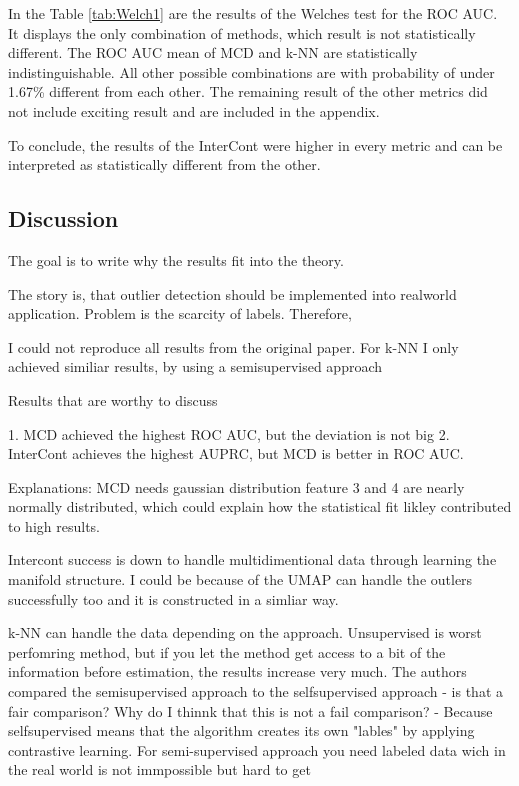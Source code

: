 In the Table \ref{tab:Welch1} are the results of the Welches test for the ROC AUC.
It displays the only combination of methods, which result is not statistically different.
The ROC AUC mean of MCD and k-NN are statistically indistinguishable.
All other possible combinations are with probability of under 1.67\% different from each other.
The remaining result of the other metrics did not include exciting result and are included in the appendix. 
 
To conclude, the results of the InterCont were higher in every metric and can be interpreted as statistically different from the other.


\subsection{Discussion}
The goal is to write why the results fit into the theory.


The story is, that outlier detection should be implemented into realworld application.
Problem is the scarcity of labels. 
Therefore, 

I could not reproduce all results from the original paper.
For k-NN I only achieved similiar results, by using a semisupervised approach

Results that are worthy to discuss

1. MCD achieved the highest ROC AUC, but the deviation is not big
2. InterCont achieves the highest AUPRC, but MCD is better in ROC AUC.

Explanations:
MCD needs gaussian distribution feature 3 and 4 are nearly normally distributed, which could explain how the statistical fit likley contributed to high results.


Intercont success is down to handle multidimentional data through learning the manifold structure.
I could be because of the UMAP can handle the outlers successfully too and it is constructed in a simliar way.


k-NN can handle the data depending on the approach.
Unsupervised is worst perfomring method, but if you let the method get access to a bit of the information before estimation, the results increase very much.
The authors compared the semisupervised approach to the selfsupervised approach - is that a fair comparison? 
Why do I thinnk that this is not a fail comparison? - Because selfsupervised means that the algorithm creates its own "lables" by applying contrastive learning.
For semi-supervised approach you need labeled data wich in the real world is not immpossible but hard to get 


